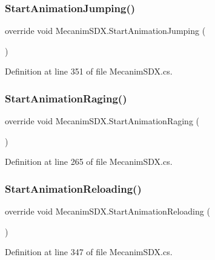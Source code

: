 \subsubsection{\texorpdfstring{StartAnimationJumping()}{StartAnimationJumping()}}
{\footnotesize\ttfamily override void Mecanim\+S\+D\+X.\+Start\+Animation\+Jumping (\begin{DoxyParamCaption}{ }\end{DoxyParamCaption})}



Definition at line 351 of file Mecanim\+S\+D\+X.\+cs.

\mbox{\label{class_mecanim_s_d_x_a6e4c25012d26e7b01fdf4e252c65314d}} 
\subsubsection{\texorpdfstring{StartAnimationRaging()}{StartAnimationRaging()}}
{\footnotesize\ttfamily override void Mecanim\+S\+D\+X.\+Start\+Animation\+Raging (\begin{DoxyParamCaption}{ }\end{DoxyParamCaption})}



Definition at line 265 of file Mecanim\+S\+D\+X.\+cs.

\mbox{\label{class_mecanim_s_d_x_a8d5746017b67ff664d5dabb6504f1ceb}} 
\subsubsection{\texorpdfstring{StartAnimationReloading()}{StartAnimationReloading()}}
{\footnotesize\ttfamily override void Mecanim\+S\+D\+X.\+Start\+Animation\+Reloading (\begin{DoxyParamCaption}{ }\end{DoxyParamCaption})}



Definition at line 347 of file Mecanim\+S\+D\+X.\+cs.

\mbox{\label{class_mecanim_s_d_x_ac65f5041a8f62a2f7e7eec84b8cdf446}} 
